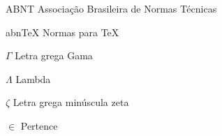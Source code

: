 \documentclass[
	12pt,					%
	openright,				%
	twoside,					%
	a4paper,					%
	english,					%
	brazil					%
	]{abntex2}
\begin{document}
\frenchspacing

\pretextual



\imprimirfolhaderosto*

% 

% 

% 

% 

% 



\listoffigures*

\listoftables*

\begin{siglas}
  \item[ABNT] Associação Brasileira de Normas Técnicas
  \item[abnTeX] Normas para TeX
\end{siglas}

\begin{simbolos}
  \item[$ \Gamma $] Letra grega Gama
  \item[$ \Lambda $] Lambda
  \item[$ \zeta $] Letra grega minúscula zeta
  \item[$ \in $] Pertence
\end{simbolos}

\tableofcontents*

\textual
\setcounter{page}{1}
\end{document}
